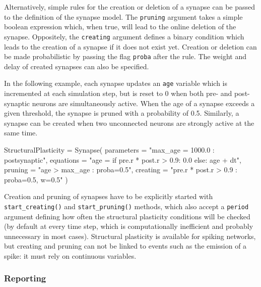 \documentclass[
  11pt,
  a4paper,
]{scrbook}
\newenvironment{Shaded}{}{}
\newcommand{\NormalTok}[1]{\textcolor[rgb]{0.14,0.16,0.18}{#1}}
\newcommand{\OperatorTok}[1]{\textcolor[rgb]{0.14,0.16,0.18}{#1}}
\newcommand{\StringTok}[1]{\textcolor[rgb]{0.01,0.18,0.38}{#1}}
\begin{document}
Alternatively, simple rules for the creation or deletion of a synapse
can be passed to the definition of the synapse model. The
\texttt{pruning} argument takes a simple boolean expression which, when
true, will lead to the online deletion of the synapse. Oppositely, the
\texttt{creating} argument defines a binary condition which leads to the
creation of a synapse if it does not exist yet. Creation or deletion can
be made probabilistic by passing the flag \texttt{proba} after the rule.
The weight and delay of created synapses can also be specified.

In the following example, each synapse updates an \texttt{age} variable
which is incremented at each simulation step, but is reset to 0 when
both pre- and post-synaptic neurons are simultaneously active. When the
age of a synapse exceeds a given threshold, the synapse is pruned with a
probability of 0.5. Similarly, a synapse can be created when two
unconnected neurons are strongly active at the same time.

\begin{Shaded}
\begin{Highlighting}[]
\NormalTok{StructuralPlasticity }\OperatorTok{=}\NormalTok{ Synapse(}
\NormalTok{    parameters }\OperatorTok{=} \StringTok{"max\_age = 1000.0 : postsynaptic"}\NormalTok{,}
\NormalTok{    equations }\OperatorTok{=} \StringTok{"age = if pre.r * post.r \textgreater{} 0.9: 0.0 else: age + dt"}\NormalTok{,}
\NormalTok{    pruning }\OperatorTok{=} \StringTok{"age \textgreater{} max\_age : proba=0.5"}\NormalTok{,}
\NormalTok{    creating }\OperatorTok{=} \StringTok{"pre.r * post.r \textgreater{} 0.9 : proba=0.5, w=0.5"}
\NormalTok{)}
\end{Highlighting}
\end{Shaded}

Creation and pruning of synapses have to be explicitly started with
\texttt{start\_creating()} and \texttt{start\_pruning()} methods, which
also accept a \texttt{period} argument defining how often the structural
plasticity conditions will be checked (by default at every time step,
which is computationally inefficient and probably unnecessary in most
cases). Structural plasticity is available for spiking networks, but
creating and pruning can not be linked to events such as the emission of
a spike: it must rely on continuous variables.

\subsubsection*{Reporting}\label{reporting}
\end{document}
